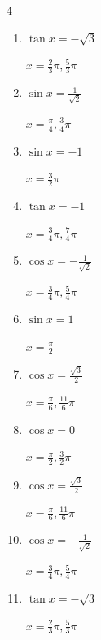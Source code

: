 \begin{multicols}{4}
\begin{enumerate}
        $\displaystyle x = \frac{\pi}{6} , \frac{11}{6}\pi$

  \item $\displaystyle \tan{x}  = -\sqrt{3}$

        $\displaystyle x = \frac{2}{3}\pi , \frac{5}{3}\pi$

  \item $\displaystyle \sin{x}  = \frac{1}{\sqrt{2}}$

        $\displaystyle x = \frac{\pi}{4} , \frac{3}{4}\pi$

  \item $\displaystyle \sin{x}  = -1$

        $\displaystyle x = \frac{3}{2}\pi$

  \item $\displaystyle \tan{x}  = -1$

        $\displaystyle x = \frac{3}{4}\pi , \frac{7}{4}\pi$

  \item $\displaystyle \cos{x}  = -\frac{1}{\sqrt{2}}$

        $\displaystyle x = \frac{3}{4}\pi , \frac{5}{4}\pi$

  \item $\displaystyle \sin{x}  = 1$

        $\displaystyle x = \frac{\pi}{2}$

  \item $\displaystyle \cos{x}  = \frac{\sqrt{3}}{2}$

        $\displaystyle x = \frac{\pi}{6} , \frac{11}{6}\pi$

  \item $\displaystyle \cos{x}  = 0$

        $\displaystyle x = \frac{\pi}{2} , \frac{3}{2}\pi$

  \item $\displaystyle \cos{x}  = \frac{\sqrt{3}}{2}$

        $\displaystyle x = \frac{\pi}{6} , \frac{11}{6}\pi$

\columnbreak %

  \item $\displaystyle \cos{x}  = -\frac{1}{\sqrt{2}}$

        $\displaystyle x = \frac{3}{4}\pi , \frac{5}{4}\pi$

  \item $\displaystyle \tan{x}  = -\sqrt{3}$

        $\displaystyle x = \frac{2}{3}\pi , \frac{5}{3}\pi$


\end{enumerate}
\end{multicols}
